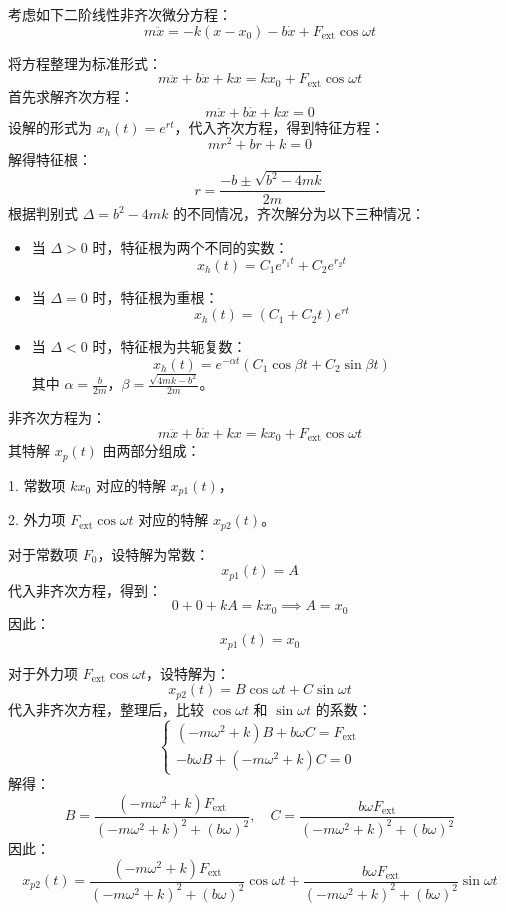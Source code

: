 \begin{prove}[求解受迫振动的微分方程]
    考虑如下二阶线性非齐次微分方程：
    \[
        m\ddot{x} = -k(x - x_0) - b\dot{x} + F_{\text{ext}} \cos \omega t
    \]

    将方程整理为标准形式：
    \[
        m\ddot{x} + b\dot{x} + kx = kx_0 + F_{\text{ext}} \cos \omega t
    \]
    首先求解齐次方程：
    \[
        m\ddot{x} + b\dot{x} + kx = 0
    \]
    设解的形式为 \(x_h(t) = e^{rt}\)，代入齐次方程，得到特征方程：
    \[
        mr^2 + br + k = 0
    \]
    解得特征根：
    \[
        r = \frac{-b \pm \sqrt{b^2 - 4mk}}{2m}
    \]
    根据判别式 \(\Delta = b^2 - 4mk\) 的不同情况，齐次解分为以下三种情况：
    \begin{itemize}
        \item 当 \(\Delta > 0\) 时，特征根为两个不同的实数：
              \[
                  x_h(t) = C_1 e^{r_1 t} + C_2 e^{r_2 t}
              \]
        \item 当 \(\Delta = 0\) 时，特征根为重根：
              \[
                  x_h(t) = (C_1 + C_2 t) e^{rt}
              \]
        \item 当 \(\Delta < 0\) 时，特征根为共轭复数：
              \[
                  x_h(t) = e^{-\alpha t} \left( C_1 \cos \beta t + C_2 \sin \beta t \right)
              \]
              其中 \(\alpha = \frac{b}{2m}\)，\(\beta = \frac{\sqrt{4mk - b^2}}{2m}\)。
    \end{itemize}

    非齐次方程为：
    \[
        m\ddot{x} + b\dot{x} + kx = kx_0 + F_{\text{ext}} \cos \omega t
    \]
    其特解 \(x_p(t)\) 由两部分组成：\par
    1. 常数项 \(kx_0\) 对应的特解 \(x_{p1}(t)\)，\par
    2. 外力项 \(F_{\text{ext}} \cos \omega t\) 对应的特解 \(x_{p2}(t)\)。\par

    对于常数项 \(F_0\)，设特解为常数：
    \[
        x_{p1}(t) = A
    \]
    代入非齐次方程，得到：
    \[
        0 + 0 + kA = kx_0 \implies A = x_0
    \]
    因此：
    \[
        x_{p1}(t) = x_0
    \]

    对于外力项 \(F_{\text{ext}} \cos \omega t\)，设特解为：
    \[
        x_{p2}(t) = B \cos \omega t + C \sin \omega t
    \]
    代入非齐次方程，整理后，比较 \(\cos \omega t\) 和 \(\sin \omega t\) 的系数：
    \[
        \begin{cases}
            (-m\omega^2 + k)B + b\omega C = F_{\text{ext}} \\
            -b\omega B + (-m\omega^2 + k)C = 0
        \end{cases}
    \]
    解得：
    \[
        B = \frac{(-m\omega^2 + k) F_{\text{ext}}}{(-m\omega^2 + k)^2 + (b\omega)^2}, \quad C = \frac{b\omega F_{\text{ext}}}{(-m\omega^2 + k)^2 + (b\omega)^2}
    \]
    因此：
    \[
        x_{p2}(t) = \frac{(-m\omega^2 + k) F_{\text{ext}}}{(-m\omega^2 + k)^2 + (b\omega)^2} \cos \omega t + \frac{b\omega F_{\text{ext}}}{(-m\omega^2 + k)^2 + (b\omega)^2} \sin \omega t
    \]


\end{prove}
